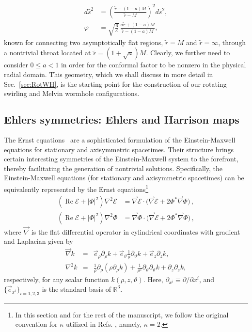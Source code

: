 \documentclass[aps,preprint,groupedaddress,nofootinbib,superscriptaddress,showkeys,showpacs,eqsecnum,amsmath,amssymb]{revtex4-1}
\newcommand{\ernst}{\mathcal{E}}
\renewcommand\Re{\operatorname{Re}}
\begin{document}
\begin{subequations}
\label{static-worm}
\begin{align}
d\hat{s}^2 &= \left( \frac{\tilde{r}-(1-a)M}{\tilde{r}-M} \right)^2 d\bar{s}^2,\\ 
\varphi &= \sqrt{\frac{6}{\kappa}} \, \frac{a\tilde{r} + (1-a)M}{\tilde{r}-(1-a)M}, 
\end{align} 
\end{subequations}
known for connecting two asymptotically flat regions, $\tilde r=M$ and $\tilde r=\infty$, through a nontrivial throat located at $\tilde{r}=(1+\sqrt{a})M$. Clearly, we further need to consider $0\leq a<1$ in order for the conformal factor to be nonzero in the physical radial domain. This geometry, which we shall discuss in more detail in Sec.~\ref{sec:RotWH}, is the starting point for the construction of our rotating swirling and Melvin wormhole configurations. 

\subsection{Ehlers symmetries: Ehlers and Harrison maps\label{sec:EhlersSym}}

The Ernst equations~\cite{Ernst:1967wx,Ernst:1967by} are a sophisticated formulation of the Einstein-Maxwell equations for stationary and axisymmetric spacetimes. Their structure brings certain interesting symmetries of the Einstein-Maxwell system to the forefront, thereby facilitating the generation of nontrivial solutions. Specifically, the Einstein-Maxwell equations (for stationary and axisymmetric spacetimes) can be equivalently represented by the Ernst equations\footnote{In this section and for the rest of the manuscript, we follow the original convention for $\kappa$ utilized in Refs. \cite{Ernst:1967wx,Ernst:1967by}, namely, $\kappa=2$.}
\begin{subequations}
\label{ernst-eqs}
\begin{align}
\left( \Re\ernst + \big|\Phi\big|^2 \right) \nabla^2\ernst & =
\vec{\nabla}\ernst\cdot \bigl( \vec\nabla\ernst + 2\Phi^* \vec\nabla\Phi \bigr) \,, \\
\left( \Re\ernst + \big|\Phi\big|^2 \right) \nabla^2\Phi & = \vec\nabla\Phi\cdot \bigl( \vec\nabla\ernst + 2\Phi^* \vec\nabla\Phi \bigr) \,,
\end{align}
\end{subequations}
where $\vec{\nabla}$ is the flat differential operator in cylindrical coordinates with gradient and Laplacian given by
\begin{subequations}
    \begin{eqnarray}
        \vec{\nabla} k &=& \vec{e}_\rho \partial_\rho k + \vec{e}_\vartheta\frac{1}{\rho}\partial_\vartheta k + \vec{e}_z \partial_zk,\\
        \nabla^2k &=& \frac{1}{\rho}\partial_\rho (\rho \partial_\rho k) + \frac{1}{\rho^2}\partial_\vartheta \partial_\vartheta k + \partial_z\partial_z k,
    \end{eqnarray}
\end{subequations}
respectively, for any scalar function $k(\rho,z,\vartheta)$. Here, $\partial_{x^i}\equiv \partial/\partial x^i$, and $\{\vec{e}_{x^i}\}_{i=1,2,3}$ is the standard basis of $\mathbb{R}^3$.
\end{document}
